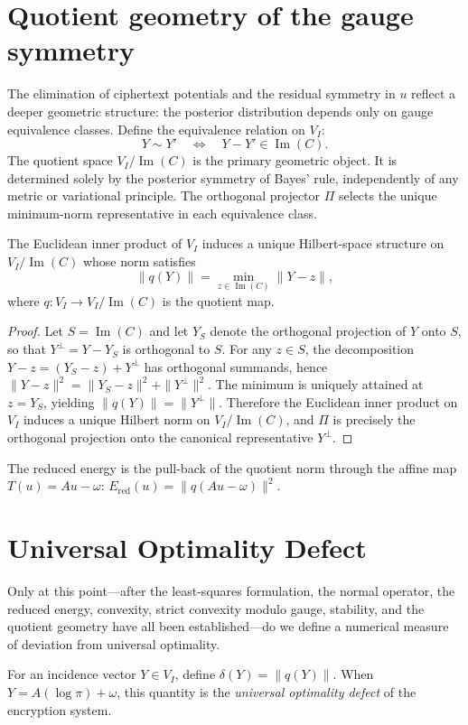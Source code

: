 \section{Quotient geometry of the gauge symmetry}\label{ch:sec:quotient-geometry-of-the-gauge-symmetry}
The elimination of ciphertext potentials and the residual symmetry in $u$ reflect a deeper geometric structure: the posterior distribution depends only on gauge equivalence classes.
Define the equivalence relation on $V_I$:
\[
Y\sim Y' \quad\Longleftrightarrow\quad Y-Y'\in\operatorname{Im}(C).
\]
The quotient space $V_I/\operatorname{Im}(C)$ is the primary geometric object.  It is determined solely by the posterior symmetry of Bayes' rule, independently of any metric or variational principle.  The orthogonal projector $\Pi$ selects the unique minimum-norm representative in each equivalence class.
\begin{theorem}\label{ch:thm:quotient-hilbert}
The Euclidean inner product of $V_I$ induces a unique Hilbert-space structure on $V_I/\operatorname{Im}(C)$ whose norm satisfies
\[
\|q(Y)\| = \min_{z\in\operatorname{Im}(C)} \|Y-z\|,
\]
where $q:V_I\to V_I/\operatorname{Im}(C)$ is the quotient map.
\end{theorem}
\begin{proof}
Let $S=\operatorname{Im}(C)$ and let $Y_S$ denote the orthogonal projection of $Y$ onto $S$, so that $Y^\perp=Y-Y_S$ is orthogonal to $S$.  For any $z\in S$, the decomposition $Y-z=(Y_S-z)+Y^\perp$ has orthogonal summands, hence $\|Y-z\|^2 = \|Y_S-z\|^2 + \|Y^\perp\|^2.$ The minimum is uniquely attained at $z=Y_S$, yielding $\|q(Y)\|=\|Y^\perp\|$.  Therefore the Euclidean inner product on $V_I$ induces a unique Hilbert norm on $V_I/\operatorname{Im}(C)$, and $\Pi$ is precisely the orthogonal projection onto the canonical representative $Y^\perp$.
\end{proof}

The reduced energy is the pull-back of the quotient norm through the affine map $T(u)=Au-\omega$:
$E_{\mathrm{red}}(u) = \|q(Au-\omega)\|^2.$
\section{Universal Optimality Defect}\label{ch:sec:universal-optimality-defect}
Only at this point---after the least-squares formulation, the normal operator, the reduced energy, convexity, strict convexity modulo gauge, stability, and the quotient geometry have all been established---do we define a numerical measure of deviation from universal optimality.
\begin{definition}\label{ch:def:defect}
For an incidence vector $Y\in V_I$, define $\delta(Y) = \|q(Y)\|.$ When $Y = A(\log\pi)+\omega$, this quantity is the \emph{universal optimality defect} of the encryption system.
\end{definition}

